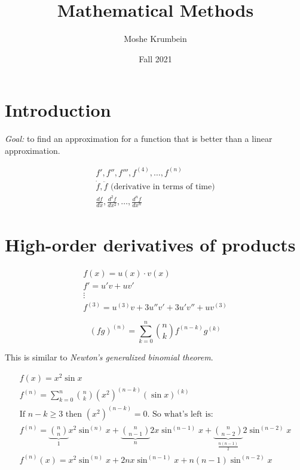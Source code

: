 \documentclass[00_complete]{subfiles}
\title{Mathematical Methods}
\author{Moshe Krumbein}
\date{Fall 2021}
\begin{document}

\section{Introduction}

\emph{Goal:} to find an approximation for a function that is better than a
linear approximation.

\begin{symbols}[Derivatives]
    $$
    \begin{gathered}
    f',f'',f''',f^{(4)},\dots, f^{(n)} \\
    \dot f, \ddot f \text{ (derivative in terms of time)}\\
    \frac{df}{dx}, \frac{d^2f}{dx^2}, \dots, \frac{d^nf}{dx^n}
    \end{gathered}
    $$
\end{symbols}

\section{High-order derivatives of products}

$$
\begin{gathered}
    f(x)= u(x) \cdot v(x) \\
    f'=u'v+uv' \\
    \vdots \\
    f^{(3)} = u^{(3)}v+3u''v'+3u'v''+uv^{(3)}
\end{gathered}
$$

\begin{definition}
    \[
        (fg)^{(n)} = \sum_{k=0}^{n} \binom{n}{k}f^{(n-k)}g^{(k)}
    \]
    \begin{note}
        This is similar to \emph{Newton's generalized binomial theorem}.
    \end{note}
\end{definition}

\begin{example}
    $$
    \begin{gathered}
        f(x)=x^2\sin x \\
        f^{(n)} = \sum_{k=0}^{n} \binom{n}{k}(x^2)^{(n-k)} (\sin x)^{(k)} \\
        \text{If $n-k \geq 3$ then $(x^2)^{(n-k)}=0$. So what's left is:} \\
        f^{(n)}=
        \underbrace{\binom{n}{n}}_{1} x^2\sin^{(n)}x +
        \underbrace{\binom{n}{n-1}}_{n} 2x\sin^{(n-1)}x +
        \underbrace{\binom{n}{n-2}}_{\frac{n(n-1)}{2}} 2\sin^{(n-2)}x \\
        \boxed{f^{(n)}(x) = x^2\sin^{(n)}x + 2nx\sin^{(n-1)}x +
        n(n-1)\sin^{(n-2)}x}
    \end{gathered}
    $$
\end{example}
\end{document}
